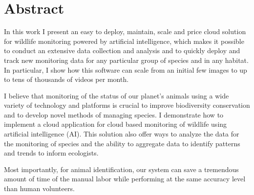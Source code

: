 
\chapter{Abstract}
In this work I present an easy to deploy, maintain, scale and price cloud solution for wildlife monitoring powered by artificial intelligence, which makes it possible to conduct an extensive data collection and analysis and to quickly deploy and track new monitoring data for any particular group of species and in any habitat. In particular, I show how this software can scale from an initial few images to up to tens of thousands of videos per month.

I believe that monitoring of the status of our planet's animals using a wide variety of technology and platforms is crucial to improve biodiversity conservation and to develop novel methods of managing species. I demonstrate how to implement a cloud application for cloud based monitoring of wildlife using artificial intelligence (AI). This solution also offer ways to analyze the data for the monitoring of species and the ability to aggregate data to identify patterns and trends to inform ecologists.

Most importantly, for animal identification, our system can save a tremendous amount of time of the manual labor while performing at the same accuracy level than human volunteers.